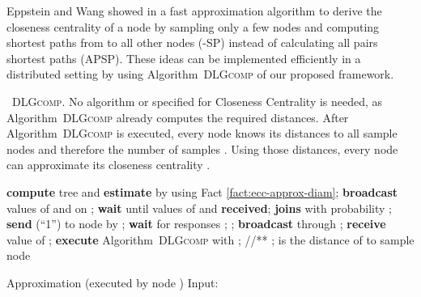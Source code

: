 \documentclass[11pt]{article}
\newif\iffull
\newif\ifshort
\begin{document}
Eppstein and Wang showed in \cite{eppstein:2001:fastCCapprox} a fast approximation algorithm to derive the closeness centrality of a node by sampling only a few nodes  and computing shortest paths from  to all other nodes (-SP) instead of calculating all pairs shortest paths (APSP).
These ideas can be implemented efficiently in a distributed setting by using Algorithm\iffull~\ref{alg:DLGcomp}\fi~\textsc{DLGcomp} of our proposed framework.
\ifshort 
A detailed description is given in Appendix \ref{FULL:sec:CC}.\\
\fi
\iffull
The Algorithm \ref{alg:CC} first computes  with a breath-first-search algorithm starting in node , then the value of  gets broadcasted through  in the network.
When a node has received , it joins  as a sample node with probability . The number of nodes joining set  are collected and broadcasted in Lines \ref{line:CCjoinSstart} to \ref{line:CCjoinSend}. In Line \ref{line:CCaccmessages}, if a node  receives multiple messages in one time slot, then in the next time slot node  sends the sum of the values of all messages to its parent in .
Now, in line \ref{line:CCexAlg}, each node executes Algorithm\iffull~\ref{alg:DLGcomp}\fi~\textsc{DLGcomp}. No algorithm  or  
specified for Closeness Centrality is needed, as Algorithm\iffull~\ref{alg:DLGcomp}\fi~\textsc{DLGcomp} already computes the required distances.
After Algorithm\iffull~\ref{alg:DLGcomp}\fi~\textsc{DLGcomp} is executed, every node knows its distances  to all sample nodes  and therefore the number of samples . Using those distances, every node  can approximate its closeness centrality . 

\begin{algorithm}[htb]
\begin{algorithmic}[1]
\IF{}
        \STATE \textbf{compute} tree  and \textbf{estimate}  by using Fact \ref{fact:ecc-approx-diam};
        \STATE \textbf{broadcast} values of  and  on ;
\ELSE
        \STATE \textbf{wait} until values of  and  \textbf{received};
\ENDIF
\STATE  \textbf{joins}  with probability ;
\IF{} \label{line:CCjoinSstart}
        \STATE \textbf{send} (``1'') to node  by ; \label{line:CCaccmessages}
\ENDIF
\IF{}
        \STATE \textbf{wait} for responses ;
        \STATE ;
        \STATE \textbf{broadcast}  through ;
\ELSE
        \STATE \textbf{receive} value of ;
\ENDIF \label{line:CCjoinSend}
\STATE \textbf{execute} Algorithm\iffull~\ref{alg:DLGcomp}\fi~\textsc{DLGcomp} with ; \label{line:CCexAlg}
\STATE  //** ; is the distance of  to sample node 
\end{algorithmic}
\caption{ Approximation (executed by node ) \newline Input:  }\label{alg:CC}
\vspace*{0.5cm}
\end{algorithm}
\end{document}
